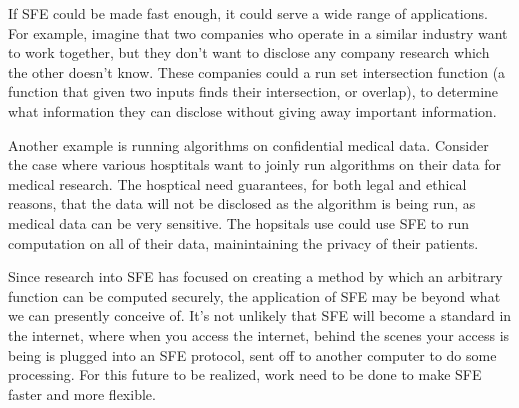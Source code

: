 If SFE could be made fast enough, it could serve a wide range of applications.
For example, imagine that two companies who operate in a similar industry want to work together, but they don't want to disclose any company research which the other doesn't know.
These companies could a run set intersection function (a function that given two inputs finds their intersection, or overlap), to determine what information they can disclose without giving away important information.

Another example is running algorithms on confidential medical data. 
Consider the case where various hosptitals want to joinly run algorithms on their data for medical research.
The hosptical need guarantees, for both legal and ethical reasons, that the data will not be disclosed as the algorithm is being run, as medical data can be very sensitive. 
The hopsitals use could use SFE to run computation on all of their data, mainintaining the privacy of their patients.

Since research into SFE has focused on creating a method by which an arbitrary function can be computed securely, the application of SFE may be beyond what we can presently conceive of. 
It's not unlikely that SFE will become a standard in the internet, where when you access the internet, behind the scenes your access is being is plugged into an SFE protocol, sent off to another computer to do some processing. 
For this future to be realized, work need to be done to make SFE faster and more flexible.



